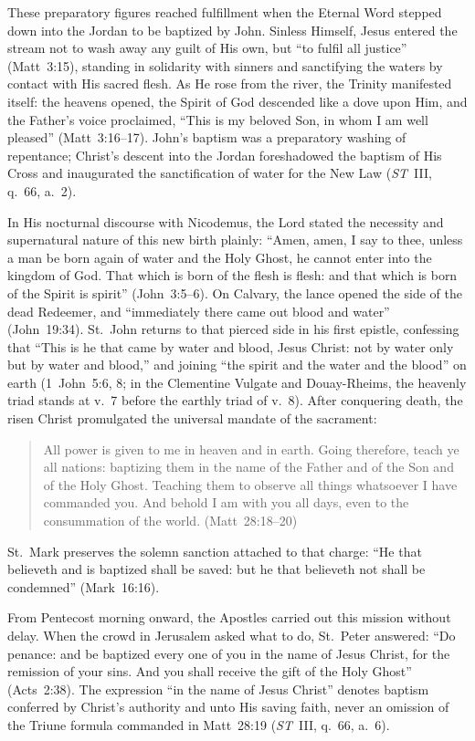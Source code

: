 These preparatory figures reached fulfillment when the Eternal Word stepped down into the Jordan to be baptized by John. Sinless Himself, Jesus entered the stream not to wash away any guilt of His own, but ``to fulfil all justice'' (Matt~3:15), standing in solidarity with sinners and sanctifying the waters by contact with His sacred flesh. As He rose from the river, the Trinity manifested itself: the heavens opened, the Spirit of God descended like a dove upon Him, and the Father's voice proclaimed, ``This is my beloved Son, in whom I am well pleased'' (Matt~3:16--17). John's baptism was a preparatory washing of repentance; Christ's descent into the Jordan foreshadowed the baptism of His Cross and inaugurated the sanctification of water for the New Law (\emph{ST}~III, q.~66, a.~2).

In His nocturnal discourse with Nicodemus, the Lord stated the necessity and supernatural nature of this new birth plainly: ``Amen, amen, I say to thee, unless a man be born again of water and the Holy Ghost, he cannot enter into the kingdom of God. That which is born of the flesh is flesh: and that which is born of the Spirit is spirit'' (John~3:5--6). On Calvary, the lance opened the side of the dead Redeemer, and ``immediately there came out blood and water'' (John~19:34). St.~John returns to that pierced side in his first epistle, confessing that ``This is he that came by water and blood, Jesus Christ: not by water only but by water and blood,'' and joining ``the spirit and the water and the blood'' on earth (1~John~5:6, 8; in the Clementine Vulgate and Douay-Rheims, the heavenly triad stands at v.~7 before the earthly triad of v.~8). After conquering death, the risen Christ promulgated the universal mandate of the sacrament:
\begin{quotation}
All power is given to me in heaven and in earth. Going therefore, teach ye all nations: baptizing them in the name of the Father and of the Son and of the Holy Ghost. Teaching them to observe all things whatsoever I have commanded you. And behold I am with you all days, even to the consummation of the world. (Matt~28:18--20)
\end{quotation}
St.~Mark preserves the solemn sanction attached to that charge: ``He that believeth and is baptized shall be saved: but he that believeth not shall be condemned'' (Mark~16:16).

From Pentecost morning onward, the Apostles carried out this mission without delay. When the crowd in Jerusalem asked what to do, St.~Peter answered: ``Do penance: and be baptized every one of you in the name of Jesus Christ, for the remission of your sins. And you shall receive the gift of the Holy Ghost'' (Acts~2:38). The expression ``in the name of Jesus Christ'' denotes baptism conferred by Christ's authority and unto His saving faith, never an omission of the Triune formula commanded in Matt~28:19 (\emph{ST}~III, q.~66, a.~6).

